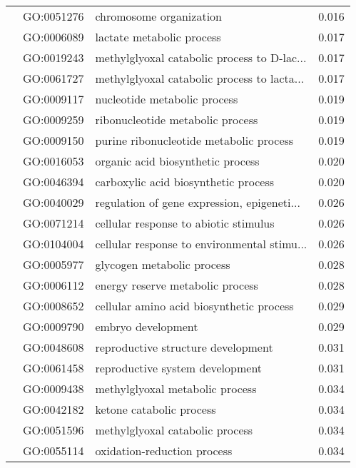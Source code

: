 \begin{longtable}{lllr}
   & GO:0051276 &                      chromosome organization &         0.016 \\
   & GO:0006089 &                    lactate metabolic process &         0.017 \\
   & GO:0019243 &  methylglyoxal catabolic process to D-lac... &         0.017 \\
   & GO:0061727 &  methylglyoxal catabolic process to lacta... &         0.017 \\
   & GO:0009117 &                 nucleotide metabolic process &         0.019 \\
   & GO:0009259 &             ribonucleotide metabolic process &         0.019 \\
   & GO:0009150 &      purine ribonucleotide metabolic process &         0.019 \\
   & GO:0016053 &            organic acid biosynthetic process &         0.020 \\
   & GO:0046394 &         carboxylic acid biosynthetic process &         0.020 \\
   & GO:0040029 &  regulation of gene expression, epigeneti... &         0.026 \\
   & GO:0071214 &        cellular response to abiotic stimulus &         0.026 \\
   & GO:0104004 &  cellular response to environmental stimu... &         0.026 \\
   & GO:0005977 &                   glycogen metabolic process &         0.028 \\
   & GO:0006112 &             energy reserve metabolic process &         0.028 \\
   & GO:0008652 &     cellular amino acid biosynthetic process &         0.029 \\
   & GO:0009790 &                           embryo development &         0.029 \\
   & GO:0048608 &           reproductive structure development &         0.031 \\
   & GO:0061458 &              reproductive system development &         0.031 \\
   & GO:0009438 &              methylglyoxal metabolic process &         0.034 \\
   & GO:0042182 &                     ketone catabolic process &         0.034 \\
   & GO:0051596 &              methylglyoxal catabolic process &         0.034 \\
   & GO:0055114 &                  oxidation-reduction process &         0.034 \\

\end{longtable}
